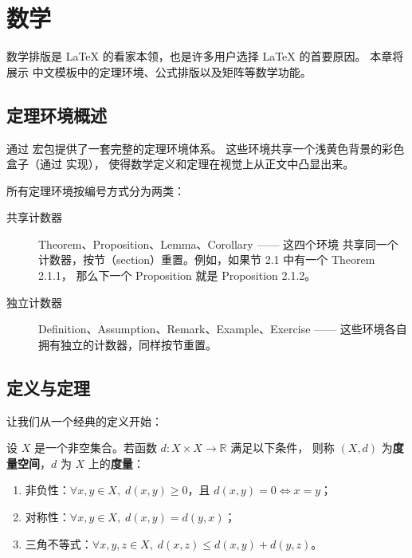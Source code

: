 \setchapterpreamble[u]{\margintoc}
\chapter{数学}

数学排版是 \LaTeX{} 的看家本领，也是许多用户选择 \LaTeX{} 的首要原因。
本章将展示  中文模板中的定理环境、公式排版以及矩阵等数学功能。


\section{定理环境概述}

 通过  宏包提供了一套完整的定理环境体系。
这些环境共享一个浅黄色背景的彩色盒子（通过  实现），
使得数学定义和定理在视觉上从正文中凸显出来。

所有定理环境按编号方式分为两类：

\begin{description}
    \item[共享计数器] Theorem、Proposition、Lemma、Corollary —— 这四个环境
        共享同一个计数器，按节（section）重置。例如，如果节 2.1 中有一个 Theorem 2.1.1，
        那么下一个 Proposition 就是 Proposition 2.1.2。
    \item[独立计数器] Definition、Assumption、Remark、Example、Exercise ——
        这些环境各自拥有独立的计数器，同样按节重置。
\end{description}


\section{定义与定理}

让我们从一个经典的定义开始：

\begin{definition}[度量空间]
设 $X$ 是一个非空集合。若函数 $d: X \times X \to \mathbb{R}$ 满足以下条件，
则称 $(X, d)$ 为\textbf{度量空间}，$d$ 为 $X$ 上的\textbf{度量}：
\begin{enumerate}[label=(\roman*)]
    \item 非负性：$\forall x, y \in X,\; d(x, y) \ge 0$，且 $d(x, y) = 0 \iff x = y$；
    \item 对称性：$\forall x, y \in X,\; d(x, y) = d(y, x)$；
    \item 三角不等式：$\forall x, y, z \in X,\; d(x, z) \le d(x, y) + d(y, z)$。
\end{enumerate}
\end{definition}

